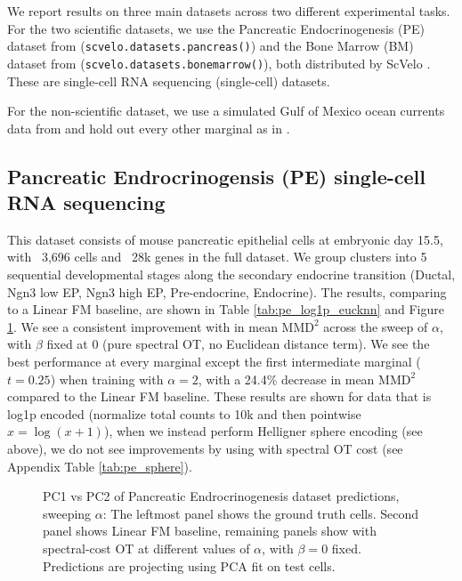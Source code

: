 We report results on three main datasets across two different experimental tasks. For the two scientific datasets, we use the Pancreatic Endocrinogenesis (PE) dataset from \citet{bastidas-ponceComprehensiveSingleCell2019} (\texttt{scvelo.datasets.pancreas()}) and the Bone Marrow (BM) dataset from \citet{settyCharacterizationCellFate2019} (\texttt{scvelo.datasets.bonemarrow()}), both distributed by ScVelo \cite{bergenScVeloGeneralizingRNA2020}. These are single-cell RNA sequencing (single-cell) datasets.

For the non-scientific dataset, we use a simulated Gulf of Mexico ocean currents data from \citet{shenMultimarginalSchrodingerBridges} and hold out every other marginal as in \citet{rohbeckMODELINGCOMPLEXSYSTEM2025, theodoropoulosMomentumMultiMarginalSchrodinger2025}.

\subsection{Pancreatic Endrocrinogensis (PE) single-cell RNA sequencing}
This dataset consists of mouse pancreatic epithelial cells at embryonic day 15.5, with ~3,696 cells and ~28k genes in the full dataset. We group clusters into 5 sequential developmental stages along the secondary endocrine transition (Ductal, Ngn3 low EP, Ngn3 high EP, Pre-endocrine, Endocrine). The results, comparing to a Linear FM baseline, are shown in Table \ref{tab:pe_log1p_eucknn} and Figure \ref{fig:pancreas_pca}. We see a consistent improvement with \ourmodel in mean $\mathrm{MMD}^2$ across the sweep of $\alpha$, with $\beta$ fixed at $0$ (pure spectral OT, no Euclidean distance term). We see the best performance at every marginal except the first intermediate marginal ($t=0.25$) when training \ourmodel with $\alpha=2$, with a 24.4\% decrease in mean $\mathrm{MMD}^2$ compared to the Linear FM baseline. These results are shown for data that is log1p encoded (normalize total counts to 10k and then pointwise $x=\log(x+1)$), when we instead perform Helligner sphere encoding (see above), we do not see improvements by using \ourmodel with spectral OT cost (see Appendix Table \ref{tab:pe_sphere}).



\begin{figure}[t]
\centering

\caption{PC1 vs PC2 of Pancreatic Endrocrinogenesis dataset predictions, sweeping $\alpha$: The leftmost panel shows the ground truth cells. Second panel shows Linear FM baseline, remaining panels show \ourmodel with spectral-cost OT at different values of $\alpha$, with $\beta=0$ fixed. Predictions are projecting using PCA fit on test cells.}
\label{fig:pancreas_pca}
\end{figure}

